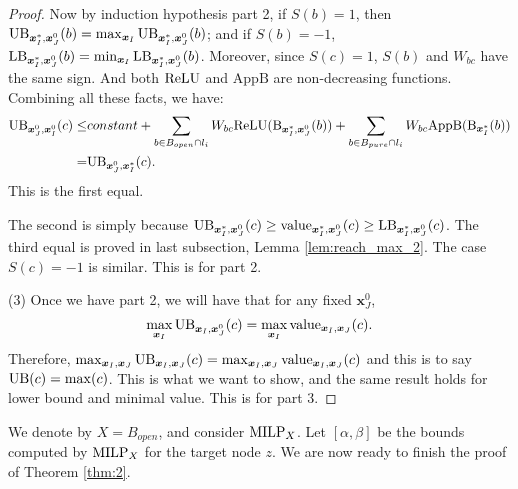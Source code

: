 \begin{proof}
				Now by induction hypothesis part 2, if $S(b)=1$, then $\mathrm{UB}_{\boldsymbol{x}^*_I,\boldsymbol{x}^0_J}(b)=\max_{\boldsymbol{x}_I}\mathrm{UB}_{\boldsymbol{x}^*_I,\boldsymbol{x}^0_J}(b)$; and if $S(b)=-1$, $\mathrm{LB}_{\boldsymbol{x}^*_I,\boldsymbol{x}^0_J}(b)=\min_{\boldsymbol{x}_I}\mathrm{LB}_{\boldsymbol{x}^*_I,\boldsymbol{x}^0_J}(b)$. Moreover, since $S(c)=1$, $S(b)$ and $W_{bc}$ have the same sign. And both $\mathrm{ReLU}$ and $\mathrm{AppB}$ are non-decreasing functions. Combining all these facts, we have:\begin{align*}
					\mathrm{UB}_{\boldsymbol{x}^0_J,\boldsymbol{x}^0_I}(c)\leq 
					&constant + \sum_{b\in B_{open}\cap l_i} W_{bc}\mathrm{ReLU}(\mathrm{B}_{\boldsymbol{x}^*_I,\boldsymbol{x}^0_J}(b)) + \sum_{b\in B_{pure}\cap l_{i}} W_{bc} \mathrm{AppB}(\mathrm{B}_{\boldsymbol{x}^*_I}(b))\\
					= & \mathrm{UB}_{\boldsymbol{x}^0_J,\boldsymbol{x}^*_I}(c). 
				\end{align*}  This is the first equal.
				
				The second is simply because $\mathrm{UB}_{\boldsymbol{x}^*_I,\boldsymbol{x}^0_J}(c)\geq {\textrm{value}}_{\boldsymbol{x}^*_I,\boldsymbol{x}^0_J}(c)\geq\mathrm{LB}_{\boldsymbol{x}^*_I,\boldsymbol{x}^0_J}(c)$.	The third equal is proved in last subsection, Lemma \ref{lem:reach_max_2}. The case $S(c)=-1$ is similar. This is for part 2.
				
				(3) Once we have part 2, we will have that for any fixed $\boldsymbol{x}^0_J$, $$\max_{\boldsymbol{x}_I} \mathrm{UB}_{\boldsymbol{x}_I,\boldsymbol{x}^0_J}(c)= \max_{\boldsymbol{x}_I} {\textrm{value}}_{\boldsymbol{x}_I,\boldsymbol{x}_J}(c).$$ Therefore, $\max_{\boldsymbol{x}_I,\boldsymbol{x}_J} \mathrm{UB}_{\boldsymbol{x}_I,\boldsymbol{x}_J}(c)= \max_{\boldsymbol{x}_I,\boldsymbol{x}_J} {\textrm{value}}_{\boldsymbol{x}_I,\boldsymbol{x}_J}(c)$ and this is to say $\mathrm{UB}(c)=\max(c)$. This is what we want to show, and the same result holds for lower bound and minimal value. This is for part 3. 

			\end{proof}

	\fi



	We denote by $X=B_{open}$, and consider ${\textrm{MILP}}_{X}$.
	Let $[\alpha,\beta]$ be the bounds computed by ${\textrm{MILP}}_{X}$ for the target node $z$. We are now ready to finish the proof of Theorem \ref{thm:2}.

